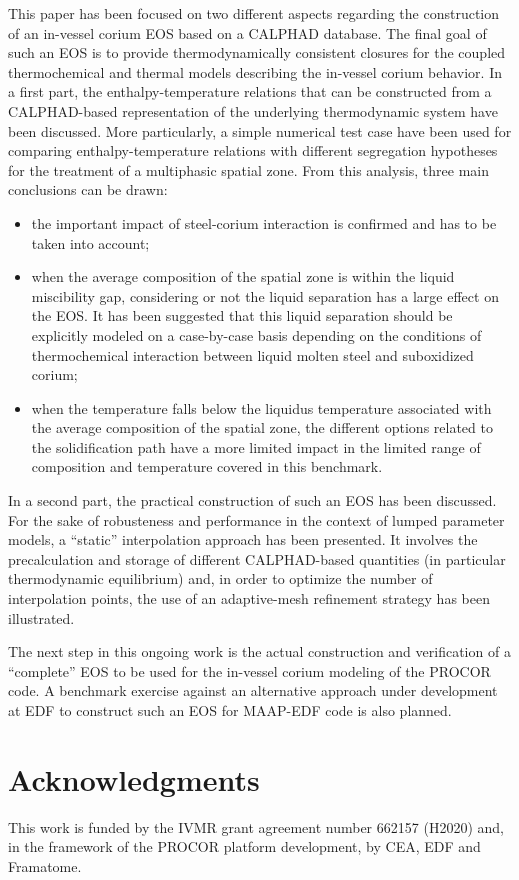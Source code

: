 \documentclass[11pt]{article}\usepackage{geometry} \geometry{letterpaper, margin=25.4mm}
\begin{document}
This paper has been focused on two different aspects regarding the construction of an in-vessel corium EOS based on a CALPHAD database. The final goal of such an EOS is to provide thermodynamically consistent closures for the coupled  thermochemical and thermal models describing the in-vessel corium behavior. 
In a first part, the enthalpy-temperature relations that can be constructed from a CALPHAD-based representation of the underlying thermodynamic system have been discussed. More particularly, a simple numerical test case have been used for comparing enthalpy-temperature relations with different segregation hypotheses for the treatment of a multiphasic spatial zone. From this analysis, three main conclusions can be drawn:
\begin{itemize}
 \item the important impact of steel-corium interaction is confirmed and has to be taken into account;
 \item when the average composition of the spatial zone is within the liquid miscibility gap, considering or not the liquid separation has a large effect on the EOS. It has been suggested that this liquid separation should be explicitly modeled on a case-by-case basis depending on the conditions of thermochemical interaction between liquid molten steel and suboxidized corium;
 \item when the temperature falls below the liquidus temperature associated with the average composition of the spatial zone, the different options related to the solidification path have a more limited impact in the limited range of composition and temperature covered in this benchmark.
\end{itemize}
In a second part, the practical construction of such an EOS has been discussed. For the sake of robusteness and performance in the context of lumped parameter models, a ``static'' interpolation approach has been presented. It involves the precalculation and storage of different CALPHAD-based quantities (in particular thermodynamic equilibrium) and, in order to optimize the number of interpolation points, the use of an adaptive-mesh refinement strategy has been illustrated. 

The next step in this ongoing work is the actual construction and verification of a ``complete'' EOS to be used for the in-vessel corium modeling of the PROCOR code. A benchmark exercise against an alternative approach under development at EDF to construct such an EOS for MAAP-EDF code is also planned.

\section*{Acknowledgments}

This work is funded by the IVMR grant agreement number 662157 (H2020) and, in the framework of the PROCOR platform development, by CEA, EDF and Framatome.


\end{document}
